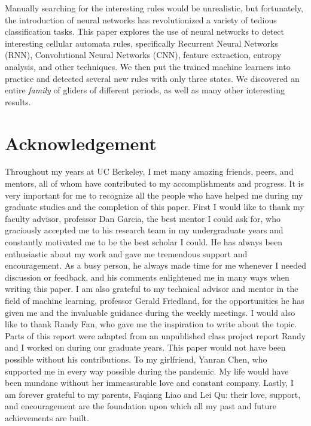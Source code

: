 \documentclass[12pt]{article}
\numberwithin{figure}{section} %
\begin{document}
Manually searching for the interesting rules would be unrealistic, but fortunately, the introduction of neural networks has revolutionized a variety of tedious classification tasks. This paper explores the use of neural networks to detect interesting cellular automata rules, specifically Recurrent Neural Networks (RNN), Convolutional Neural Networks (CNN), feature extraction, entropy analysis, and other techniques. We then put the trained machine learners into practice and detected several new rules with only three states. We discovered an entire \textit{family} of gliders of different periods, as well as many other interesting results. 

\newpage
\thispagestyle{plain}
\section*{\centering Acknowledgement}

Throughout my years at UC Berkeley, I met many amazing friends, peers, and mentors, all of whom have contributed to my accomplishments and progress. It is very important for me to recognize all the people who have helped me during my graduate studies and the completion of this paper. First I would like to thank my faculty advisor, professor Dan Garcia, the best mentor I could ask for, who graciously accepted me to his research team in my undergraduate years and constantly motivated me to be the best scholar I could. He has always been enthusiastic about my work and gave me tremendous support and encouragement. As a busy person, he always made time for me whenever I needed discussion or feedback, and his comments enlightened me in many ways when writing this paper. I am also grateful to my technical advisor and mentor in the field of machine learning, professor Gerald Friedland, for the opportunities he has given me and the invaluable guidance during the weekly meetings. I would also like to thank Randy Fan, who gave me the inspiration to write about the topic. Parts of this report were adapted from an unpublished class project report Randy and I worked on during our graduate years. This paper would not have been possible without his contributions. To my girlfriend, Yanran Chen, who supported me in every way possible during the pandemic. My life would have been mundane without her immeasurable love and constant company. Lastly, I am forever grateful to my parents, Faqiang Liao and Lei Qu: their love, support, and encouragement are the foundation upon which all my past and future achievements are built. 
\end{document}

